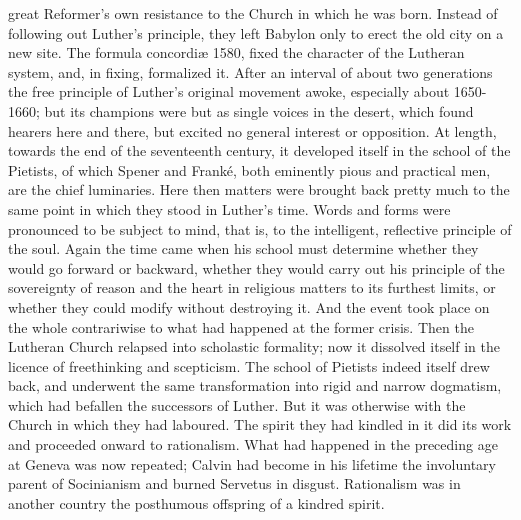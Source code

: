 great Reformer's own resistance to the Church in which he was born.
Instead of following out Luther's principle, they left Babylon only to
erect the old city on a new site. The formula concordiæ 1580, fixed the
character of the Lutheran system, and, in fixing, formalized it. After
an interval of about two generations the free principle of Luther's
original movement awoke, especially about 1650-1660; but its champions
were but as single voices in the desert, which found hearers here and
there, but excited no general interest or opposition. At length, towards
the end of the seventeenth century, it developed itself in the school of
the Pietists, of which Spener and Franké, both eminently pious and
practical men, are the chief luminaries. Here then matters were brought
back pretty much to the same point in which they stood in Luther's time.
Words and forms were pronounced to be subject to mind, that is, to the
intelligent, reflective principle of the soul. Again the time came when
his school must determine whether they would go forward or backward,
whether they would carry out his principle of the sovereignty of reason
and the heart in religious matters to its furthest limits, or whether
they could modify without destroying it. And the event took place on the
whole contrariwise to what had happened at the former crisis. Then the
Lutheran Church relapsed into scholastic formality; now it dissolved
itself in the licence of freethinking and scepticism. The school of
Pietists indeed itself drew back, and underwent the same transformation
into rigid and narrow dogmatism, which had befallen the successors of
Luther. But it was otherwise with the Church in which they had laboured.
The spirit they had kindled in it did its work and proceeded onward to
rationalism. What had happened in the preceding age at Geneva was now
repeated; Calvin had become in his lifetime the involuntary parent of
Socinianism and burned Servetus in disgust. Rationalism was in another
country the posthumous offspring of a kindred spirit.


